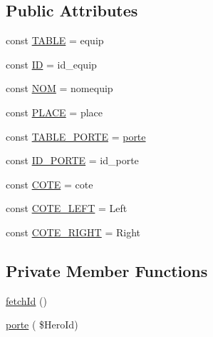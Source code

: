 \subsection*{Public Attributes}
\begin{DoxyCompactItemize}
\item 
const \hyperlink{class_hns_item_a579c5fb037841c2387c2965492621ac1}{T\+A\+B\+LE} = \textquotesingle{}equip\textquotesingle{}
\item 
const \hyperlink{class_hns_item_a2c19b74a90c2806bad8f6cc820c999c2}{ID} = \textquotesingle{}id\+\_\+equip\textquotesingle{}
\item 
const \hyperlink{class_hns_item_acc250271ab3d01f27a13cd0e0b036a3d}{N\+OM} = \textquotesingle{}nomequip\textquotesingle{}
\item 
const \hyperlink{class_hns_item_ad9e019848a5375b3907aa3ee92310a06}{P\+L\+A\+CE} = \textquotesingle{}place\textquotesingle{}
\item 
const \hyperlink{class_hns_item_abfb5a1e1c7924b1d63c61c611c701b1b}{T\+A\+B\+L\+E\+\_\+\+P\+O\+R\+TE} = \textquotesingle{}\hyperlink{class_hns_item_a19379c2ae82def5cdf755944d8074493}{porte}\textquotesingle{}
\item 
const \hyperlink{class_hns_item_a2a7dbe4b396942203b0b09cbf8d82b52}{I\+D\+\_\+\+P\+O\+R\+TE} = \textquotesingle{}id\+\_\+porte\textquotesingle{}
\item 
const \hyperlink{class_hns_item_a1b9043134a903e36e02b3382ab1b9e8a}{C\+O\+TE} = \textquotesingle{}cote\textquotesingle{}
\item 
const \hyperlink{class_hns_item_a00cf802d3306c013e6191a7430ed6729}{C\+O\+T\+E\+\_\+\+L\+E\+FT} = \textquotesingle{}Left\textquotesingle{}
\item 
const \hyperlink{class_hns_item_ac23d1482e67676fd811821143022e5e9}{C\+O\+T\+E\+\_\+\+R\+I\+G\+HT} = \textquotesingle{}Right\textquotesingle{}
\end{DoxyCompactItemize}
\subsection*{Private Member Functions}
\begin{DoxyCompactItemize}
\item 
\hyperlink{class_hns_item_a177defe3ff5dee71b06ac457c3c20e4e}{fetch\+Id} ()
\item 
\hyperlink{class_hns_item_a19379c2ae82def5cdf755944d8074493}{porte} ( \$Hero\+Id)
\end{DoxyCompactItemize}

